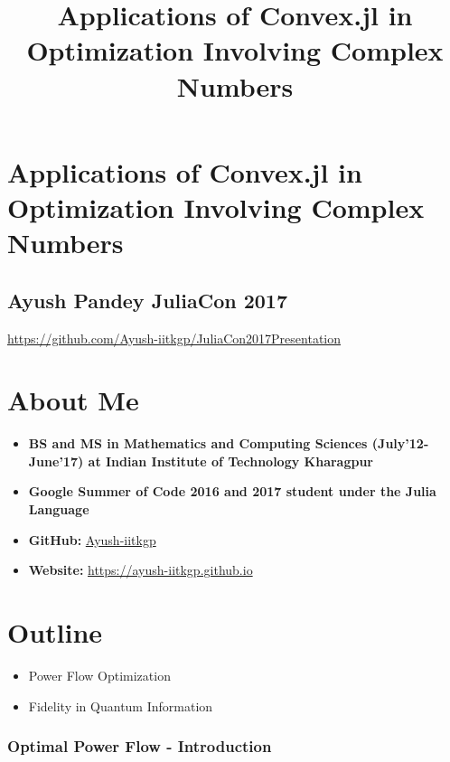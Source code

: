 \documentclass[11pt]{article}
\title{Applications of Convex.jl in Optimization Involving Complex Numbers}
\providecommand{\tightlist}{%
      \setlength{\itemsep}{0pt}\setlength{\parskip}{0pt}}
\begin{document}
    
    
    \maketitle
    
    

    
    \section{Applications of Convex.jl in Optimization Involving Complex
Numbers}\label{applications-of-convex.jl-in-optimization-involving-complex-numbers}

\subsection{Ayush Pandey \textbar{} JuliaCon
2017}\label{ayush-pandey-juliacon-2017}

\url{https://github.com/Ayush-iitkgp/JuliaCon2017Presentation}

    \section{About Me}\label{about-me}

\begin{itemize}
\item
  \textbf{BS and MS in Mathematics and Computing Sciences
  (July'12-June'17) at Indian Institute of Technology Kharagpur }
\item
  \textbf{Google Summer of Code 2016 and 2017 student under the Julia
  Language}
\item
  \textbf{GitHub:} \href{https://github.com/ayush-iitkgp}{Ayush-iitkgp}
\item
  \textbf{Website:}
  \href{https://ayush-iitkgp.github.io/}{https://ayush-iitkgp.github.io}
\end{itemize}

    \section{Outline}\label{outline}

\begin{itemize}
\tightlist
\item
  Power Flow Optimization
\item
  Fidelity in Quantum Information 
\end{itemize}

    \subsubsection{Optimal Power Flow -
Introduction}\label{optimal-power-flow---introduction}
\end{document}
